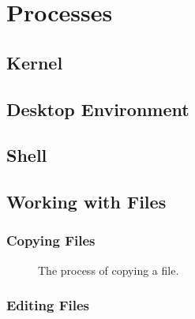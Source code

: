 \section{Processes}

\subsection{Kernel}

\subsection{Desktop Environment}

\subsection{Shell}

\subsection{Working with Files}

\subsubsection{Copying Files}

\begin{figure}[tbp]
  
  \caption{The process of copying a file.}
  \label{fig:bg:processes:copy}
\end{figure}

\subsubsection{Editing Files}
